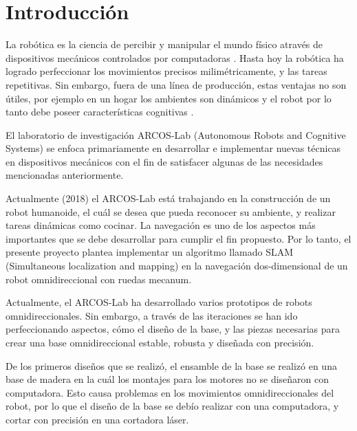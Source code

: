   \chapter{Introducción}
\label{C:introduccion}




La robótica es la ciencia de percibir y manipular el mundo físico através de dispositivos mecánicos controlados por computadoras \cite{Thrun2005}. Hasta hoy la robótica ha logrado perfeccionar los movimientos precisos milimétricamente, y las tareas repetitivas. Sin embargo, fuera de una línea de producción, estas ventajas no son útiles, por ejemplo en un hogar los ambientes son dinámicos y el robot por lo tanto debe poseer características cognitivas \cite{HelioAzevedoRenatoArcherITCenterandICM/USPJosePedroR.InstituteofMathematicalandComputerSciences2017}.

El laboratorio de investigación ARCOS-Lab (Autonomous Robots and Cognitive Systems) se enfoca primariamente en desarrollar e implementar nuevas técnicas en dispositivos mecánicos con el fin de satisfacer algunas de las necesidades mencionadas anteriormente.

Actualmente (2018) el ARCOS-Lab está trabajando en la construcción de un robot humanoide, el cuál se desea que pueda reconocer su ambiente, y realizar tareas dinámicas como cocinar. La navegación es uno de los aspectos más importantes que se debe desarrollar para cumplir el fin propuesto. Por lo tanto, el presente proyecto plantea implementar un algoritmo llamado SLAM (Simultaneous localization and mapping) en la navegación dos-dimensional de un robot omnidireccional con ruedas mecanum.

Actualmente, el ARCOS-Lab ha desarrollado varios prototipos de robots omnidireccionales. Sin embargo, a través de las iteraciones se han ido perfeccionando aspectos, cómo el diseño de la base, y las piezas necesarias para crear una base omnidireccional estable, robusta y diseñada con precisión.

De los primeros diseños que se realizó, el ensamble de la base se realizó en una base de madera en la cuál los montajes para los motores no se diseñaron con computadora. Esto causa problemas en los movimientos omnidireccionales del robot, por lo que el diseño de la base se debío realizar con una computadora, y cortar con precisión en una cortadora láser.

